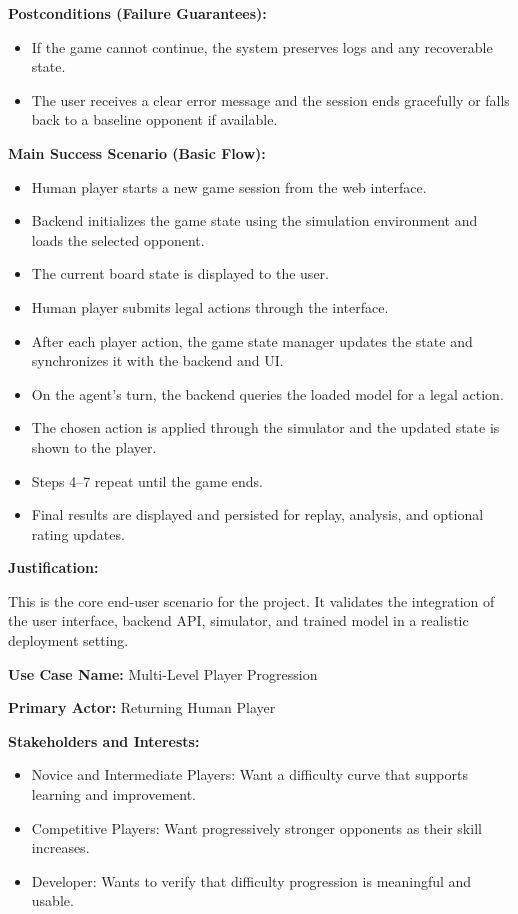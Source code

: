 \documentclass{article}
\begin{document}
\noindent\textbf{Postconditions (Failure Guarantees):}
\begin{itemize}
    \item If the game cannot continue, the system preserves logs and any recoverable state.
    \item The user receives a clear error message and the session ends gracefully or falls back to a baseline opponent if available.
\end{itemize}

\noindent\textbf{Main Success Scenario (Basic Flow):}
\begin{itemize}
    \item Human player starts a new game session from the web interface.
    \item Backend initializes the game state using the simulation environment and loads the selected opponent.
    \item The current board state is displayed to the user.
    \item Human player submits legal actions through the interface.
    \item After each player action, the game state manager updates the state and synchronizes it with the backend and UI.
    \item On the \RL{} agent's turn, the backend queries the loaded model for a legal action.
    \item The chosen action is applied through the simulator and the updated state is shown to the player.
    \item Steps 4--7 repeat until the game ends.
    \item Final results are displayed and persisted for replay, analysis, and optional rating updates.
\end{itemize}

\noindent\textbf{Justification:}

This is the core end-user scenario for the project. It validates the integration of the user interface, backend API, simulator, and trained model in a realistic deployment setting.

\vspace{1em}

\noindent\textbf{Use Case Name:} Multi-Level Player Progression

\noindent\textbf{Primary Actor:} Returning Human Player

\noindent\textbf{Stakeholders and Interests:}
\begin{itemize}
    \item Novice and Intermediate Players: Want a difficulty curve that supports learning and improvement.
    \item Competitive Players: Want progressively stronger opponents as their skill increases.
    \item Developer: Wants to verify that difficulty progression is meaningful and usable.
\end{itemize}
\end{document}
